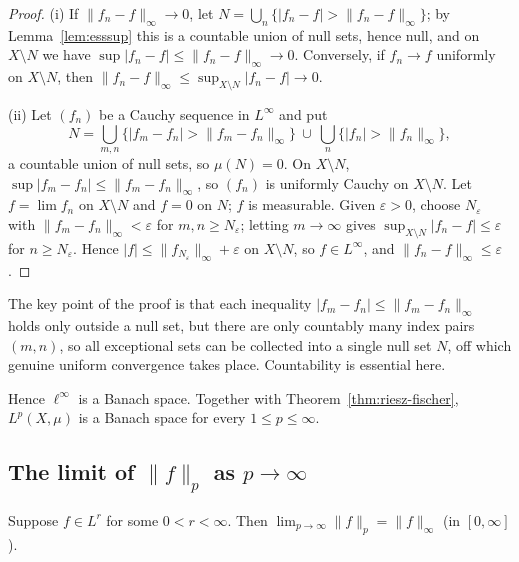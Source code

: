 \documentclass[11pt]{article}
\newcommand{\norm}[1]{\lVert #1\rVert}
\begin{document}
\begin{proof}
(i) If $\norm{f_{n}-f}_{\infty}\to0$, let $N=\bigcup_{n}\{|f_{n}-f|>\norm{f_{n}-f}_{\infty}\}$; by Lemma~\ref{lem:esssup} this is a countable union of null sets, hence null, and on $X\setminus N$ we have $\sup|f_{n}-f|\le\norm{f_{n}-f}_{\infty}\to0$. Conversely, if $f_{n}\to f$ uniformly on $X\setminus N$, then $\norm{f_{n}-f}_{\infty}\le\sup_{X\setminus N}|f_{n}-f|\to0$.

(ii) Let $(f_{n})$ be a Cauchy sequence in $L^{\infty}$ and put
\[
N=\bigcup_{m,n}\bigl\{|f_{m}-f_{n}|>\norm{f_{m}-f_{n}}_{\infty}\bigr\}\ \cup\ \bigcup_{n}\bigl\{|f_{n}|>\norm{f_{n}}_{\infty}\bigr\},
\]
a countable union of null sets, so $\mu(N)=0$. On $X\setminus N$, $\sup|f_{m}-f_{n}|\le\norm{f_{m}-f_{n}}_{\infty}$, so $(f_{n})$ is uniformly Cauchy on $X\setminus N$. Let $f=\lim f_{n}$ on $X\setminus N$ and $f=0$ on $N$; $f$ is measurable. Given $\varepsilon>0$, choose $N_{\varepsilon}$ with $\norm{f_{m}-f_{n}}_{\infty}<\varepsilon$ for $m,n\ge N_{\varepsilon}$; letting $m\to\infty$ gives $\sup_{X\setminus N}|f_{n}-f|\le\varepsilon$ for $n\ge N_{\varepsilon}$. Hence $|f|\le\norm{f_{N_{\varepsilon}}}_{\infty}+\varepsilon$ on $X\setminus N$, so $f\in L^{\infty}$, and $\norm{f_{n}-f}_{\infty}\le\varepsilon$.
\end{proof}

\begin{remark}
The key point of the proof is that each inequality $|f_{m}-f_{n}|\le\norm{f_{m}-f_{n}}_{\infty}$ holds only outside a null set, but there are only countably many index pairs $(m,n)$, so all exceptional sets can be collected into a single null set $N$, off which genuine uniform convergence takes place. Countability is essential here.
\end{remark}

Hence $\ell^{\infty}$ is a Banach space. Together with Theorem~\ref{thm:riesz-fischer}, $L^{p}(X,\mu)$ is a Banach space for every $1\le p\le\infty$.

\subsection{The limit of $\norm{f}_{p}$ as $p\to\infty$}

\begin{theorem}\label{thm:p-to-infty}
Suppose $f\in L^{r}$ for some $0<r<\infty$. Then $\lim_{p\to\infty}\norm{f}_{p}=\norm{f}_{\infty}$ (in $[0,\infty]$).
\end{theorem}
\end{document}
